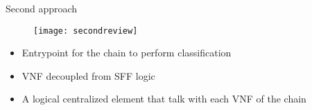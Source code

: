 \begin{frame}{Second approach}

  \vspace{-0.5cm}

  \begin{figure}
    \centering
    \texttt{[image: secondreview]}
  \end{figure}

  \vspace{0.2cm}

  \begin{itemize}
    \item Entrypoint for the chain to perform classification
    \item VNF decoupled from SFF logic
    \item A logical centralized element that talk with each VNF of the chain
  \end{itemize}

\end{frame}
